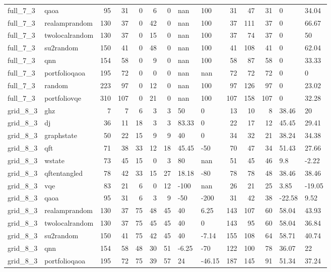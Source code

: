 \begin{longtable}{llrrrrrllrrrll}
full\_7\_3 & qaoa & 95 & 31 & 0 & 6 & 0 & nan & 100 & 31 & 47 & 31 & 0 & 34.04 \\
full\_7\_3 & realamprandom & 130 & 37 & 0 & 42 & 0 & nan & 100 & 37 & 111 & 37 & 0 & 66.67 \\
full\_7\_3 & twolocalrandom & 130 & 37 & 0 & 15 & 0 & nan & 100 & 37 & 74 & 37 & 0 & 50 \\
full\_7\_3 & su2random & 150 & 41 & 0 & 48 & 0 & nan & 100 & 41 & 108 & 41 & 0 & 62.04 \\
full\_7\_3 & qnn & 154 & 58 & 0 & 9 & 0 & nan & 100 & 58 & 87 & 58 & 0 & 33.33 \\
full\_7\_3 & portfolioqaoa & 195 & 72 & 0 & 0 & 0 & nan & nan & 72 & 72 & 72 & 0 & 0 \\
full\_7\_3 & random & 223 & 97 & 0 & 12 & 0 & nan & 100 & 97 & 126 & 97 & 0 & 23.02 \\
full\_7\_3 & portfoliovqe & 310 & 107 & 0 & 21 & 0 & nan & 100 & 107 & 158 & 107 & 0 & 32.28 \\
grid\_8\_3 & ghz & 7 & 7 & 6 & 3 & 3 & 50 & 0 & 13 & 10 & 8 & 38.46 & 20 \\
grid\_8\_3 & dj & 36 & 11 & 18 & 3 & 3 & 83.33 & 0 & 22 & 17 & 12 & 45.45 & 29.41 \\
grid\_8\_3 & graphstate & 50 & 22 & 15 & 9 & 9 & 40 & 0 & 34 & 32 & 21 & 38.24 & 34.38 \\
grid\_8\_3 & qft & 71 & 38 & 33 & 12 & 18 & 45.45 & -50 & 70 & 47 & 34 & 51.43 & 27.66 \\
grid\_8\_3 & wstate & 73 & 45 & 15 & 0 & 3 & 80 & nan & 51 & 45 & 46 & 9.8 & -2.22 \\
grid\_8\_3 & qftentangled & 78 & 42 & 33 & 15 & 27 & 18.18 & -80 & 78 & 78 & 48 & 38.46 & 38.46 \\
grid\_8\_3 & vqe & 83 & 21 & 6 & 0 & 12 & -100 & nan & 26 & 21 & 25 & 3.85 & -19.05 \\
grid\_8\_3 & qaoa & 95 & 31 & 6 & 3 & 9 & -50 & -200 & 31 & 42 & 38 & -22.58 & 9.52 \\
grid\_8\_3 & realamprandom & 130 & 37 & 75 & 48 & 45 & 40 & 6.25 & 143 & 107 & 60 & 58.04 & 43.93 \\
grid\_8\_3 & twolocalrandom & 130 & 37 & 75 & 45 & 45 & 40 & 0 & 143 & 95 & 60 & 58.04 & 36.84 \\
grid\_8\_3 & su2random & 150 & 41 & 75 & 42 & 45 & 40 & -7.14 & 155 & 108 & 64 & 58.71 & 40.74 \\
grid\_8\_3 & qnn & 154 & 58 & 48 & 30 & 51 & -6.25 & -70 & 122 & 100 & 78 & 36.07 & 22 \\
grid\_8\_3 & portfolioqaoa & 195 & 72 & 75 & 39 & 57 & 24 & -46.15 & 187 & 145 & 91 & 51.34 & 37.24 \\

\end{longtable}
